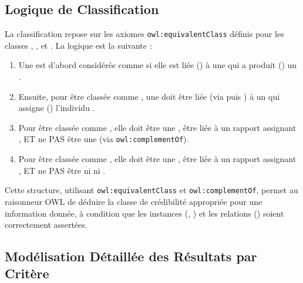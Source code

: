 \documentclass[9pt,twocolumn,twoside,french]{article}
\begin{document}
\subsection{Logique de Classification}

La classification repose sur les axiomes \texttt{owl:equivalentClass} définis pour les classes , , et . La logique est la suivante :
\begin{enumerate}
    \item Une  est d'abord considérée comme  si elle est liée () à une  qui a produit () un .
    \item Ensuite, pour être classée comme , une  doit être liée (via  puis ) à un  qui assigne () l'individu .
    \item Pour être classée comme , elle doit être une , être liée à un rapport assignant , ET ne PAS être une  (via \texttt{owl:complementOf}).
    \item Pour être classée comme , elle doit être une , être liée à un rapport assignant , ET ne PAS être ni  ni .
\end{enumerate}
Cette structure, utilisant \texttt{owl:equivalentClass} et \texttt{owl:complementOf}, permet au raisonneur OWL de déduire la classe de crédibilité appropriée pour une information donnée, à condition que les instances (, ) et les relations () soient correctement assertées.

\subsection{Modélisation Détaillée des Résultats par Critère}
\end{document}
